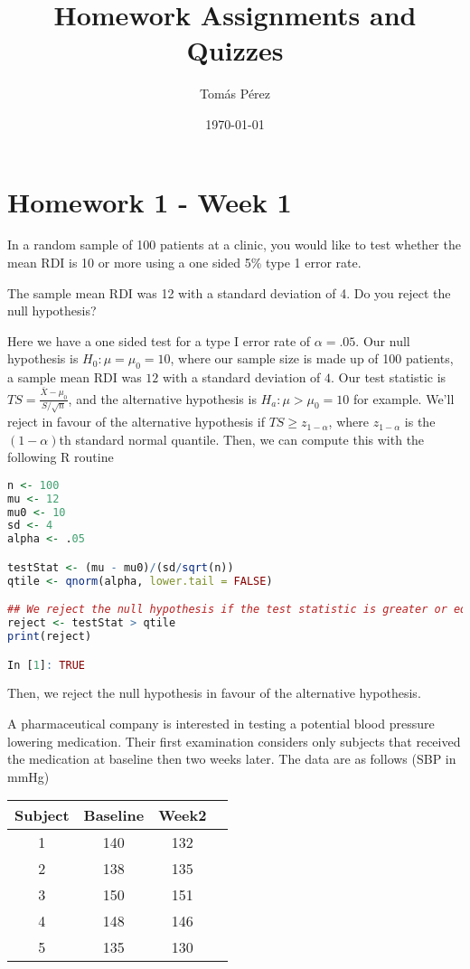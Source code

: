 \documentclass{homework}
\author{Tomás Pérez}
\date{\today}
\title{Homework Assignments and Quizzes}
\begin{document}
 \maketitle

\section{Homework 1 - Week 1}
\begin{tcolorbox}[title=Question 1]
In a  random sample of 100 patients at a clinic, you would like to test whether the mean RDI is 10 or more using a one sided 5\% type 1 error rate.

The sample mean RDI was 12 with a standard deviation of 4. Do you reject the null hypothesis?
\end{tcolorbox}

Here we have a one sided test for a type I error rate of $\alpha = .05$. Our null hypothesis is $H_0: \mu = \mu_0 = 10$, where our sample size is made up of 100 patients, a sample mean RDI was $12$ with a standard deviation of $4$. Our test statistic is $TS = \frac{\bar{X}-\mu_0}{S/\sqrt{n}}$, and the alternative hypothesis is $H_a : \mu > \mu_0 = 10$ for example. We'll reject in favour of the alternative hypothesis if $TS \geq z_{1-\alpha}$, where $z_{1-\alpha}$ is the $(1-\alpha)$th standard normal quantile. Then, we can compute this with the following R routine

\begin{lstlisting}[language=R]
n <- 100
mu <- 12
mu0 <- 10 
sd <- 4
alpha <- .05

testStat <- (mu - mu0)/(sd/sqrt(n))
qtile <- qnorm(alpha, lower.tail = FALSE)

## We reject the null hypothesis if the test statistic is greater or equal than the quantile
reject <- testStat > qtile 
print(reject)

In [1]: TRUE
\end{lstlisting}

Then, we reject the null hypothesis in favour of the alternative hypothesis. \\

\begin{tcolorbox}[title=Question 2]
A pharmaceutical company is interested in testing a potential blood pressure lowering medication. Their first examination considers only subjects that received the medication at baseline then two weeks later. The data are as follows (SBP in mmHg)

\begin{center}
\begin{tabular}{ |c|c|c|c| } 
\hline
Subject & Baseline & Week2 \\ [0.5ex] 
 \hline
1 & 140 & 132 \\ 
2 & 138 & 135 \\
3 & 150 & 151 \\
4 & 148 & 146 \\
5 & 135 & 130 \\ [1ex] 
 \hline
\end{tabular}
\end{center}

\end{tcolorbox}
\end{document}
